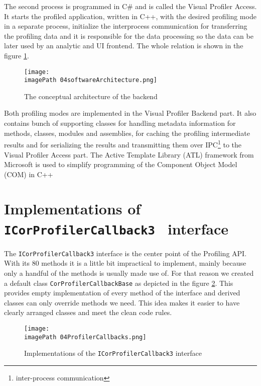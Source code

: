 The second process is programmed in C\# and is called the Visual Profiler Access. It starts the profiled application, written in C++, with the desired profiling mode in a separate process, initialize the interprocess communication for transferring the profiling data and it is responsible for the data processing so the data can be later used by an analytic and UI frontend. The whole relation is shown in the figure  \ref{fig:04softwareArchitecture}.

\begin{figure}
	\centering
		\texttt{[image: \\imagePath 04softwareArchitecture.png]}
		\caption{The conceptual architecture of the backend}
	\label{fig:04softwareArchitecture}
\end{figure}

Both profiling modes are implemented in the Visual Profiler Backend part. It also contains bunch of supporting classes for handling metadata information for methods, classes, modules and assemblies, for caching the profiling intermediate results and for serializing the results and transmitting them over IPC\footnote{inter-process communication} to the Visual Profiler Access part. The Active Template Library (ATL) framework from Microsoft is used to simplify programming of the Component Object Model (COM) in C++

\section{Implementations of \texttt{ICorProfilerCallback3 } interface}
The \texttt{ICorProfilerCallback3} interface is the center point of the Profiling API. With its 80 methods it is a little bit impractical to implement, mainly because only a handful of the methods is usually made use of. For that reason we created a default class \texttt{CorProfilerCallbackBase} as depicted in the figure \ref{fig:04ProfilerCallbacks}. This provides empty implementation of every method of the interface and derived classes can only override methods we need. This idea makes it easier to have clearly arranged classes and meet the clean code rules.

\begin{figure}
	\centering
		\texttt{[image: \\imagePath 04ProfilerCallbacks.png]}
		\caption{Implementations of the \texttt{ICorProfilerCallback3} interface}
	\label{fig:04ProfilerCallbacks}
\end{figure}

